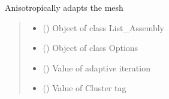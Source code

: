 \documentclass[letterpaper,10pt,english]{sphinxmanual}
\begin{document}
\begin{fulllineitems}
\label{\detokenize{modules:su2.adapt_mesh}}
\pysigstartsignatures
{}
\pysigstopsignatures
\sphinxAtStartPar
Anisotropically adapts the mesh
\begin{quote}\begin{description}
\begin{itemize}
\item {} 
\sphinxAtStartPar
{} () \textendash{} Object of class List\_Assembly

\item {} 
\sphinxAtStartPar
{} ({\hyperref[\detokenize{modules:configuration.Options}]{}}) \textendash{} Object of class Options

\item {} 
\sphinxAtStartPar
{} () \textendash{} Value of adaptive iteration

\item {} 
\sphinxAtStartPar
{} () \textendash{} Value of Cluster tag

\end{itemize}

\end{description}\end{quote}

\end{fulllineitems}

\end{document}
